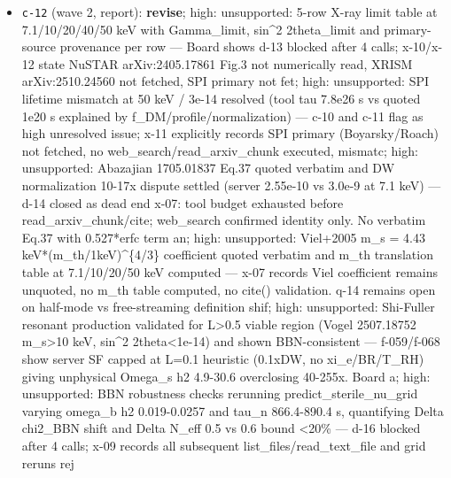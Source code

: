 \documentclass[11pt,a4paper]{article}
\begin{document}
\begin{itemize}
  \item \texttt{c-12} (wave 2, report): \textbf{revise}; high: unsupported: 5-row X-ray limit table at 7.1/10/20/40/50 keV with Gamma\_limit, sin\textasciicircum{}2 2theta\_limit and primary-source provenance per row --- Board shows d-13 blocked after 4 calls; x-10/x-12 state NuSTAR arXiv:2405.17861 Fig.3 not numerically read, XRISM arXiv:2510.24560 not fetched, SPI primary not fet; high: unsupported: SPI lifetime mismatch at 50 keV / 3e-14 resolved (tool tau 7.8e26 s vs quoted 1e20 s explained by f\_DM/profile/normalization) --- c-10 and c-11 flag as high unresolved issue; x-11 explicitly records SPI primary (Boyarsky/Roach) not fetched, no web\_search/read\_arxiv\_chunk executed, mismatc; high: unsupported: Abazajian 1705.01837 Eq.37 quoted verbatim and DW normalization 10-17x dispute settled (server 2.55e-10 vs 3.0e-9 at 7.1 keV) --- d-14 closed as dead end x-07: tool budget exhausted before read\_arxiv\_chunk/cite; web\_search confirmed identity only. No verbatim Eq.37 with 0.527*erfc term an; high: unsupported: Viel+2005 m\_s = 4.43 keV*(m\_th/1keV)\textasciicircum{}\{4/3\} coefficient quoted verbatim and m\_th translation table at 7.1/10/20/50 keV computed --- x-07 records Viel coefficient remains unquoted, no m\_th table computed, no cite() validation. q-14 remains open on half-mode vs free-streaming definition shif; high: unsupported: Shi-Fuller resonant production validated for L\textgreater{}0.5 viable region (Vogel 2507.18752 m\_s\textgreater{}10 keV, sin\textasciicircum{}2 2theta\textless{}1e-14) and shown BBN-consistent --- f-059/f-068 show server SF capped at L=0.1 heuristic (0.1xDW, no xi\_e/BR/T\_RH) giving unphysical Omega\_s h2 4.9-30.6 overclosing 40-255x. Board a; high: unsupported: BBN robustness checks rerunning predict\_sterile\_nu\_grid varying omega\_b h2 0.019-0.0257 and tau\_n 866.4-890.4 s, quantifying Delta chi2\_BBN shift and Delta N\_eff 0.5 vs 0.6 bound \textless{}20\% --- d-16 blocked after 4 calls; x-09 records all subsequent list\_files/read\_text\_file and grid reruns rej

\end{itemize}
\end{document}

